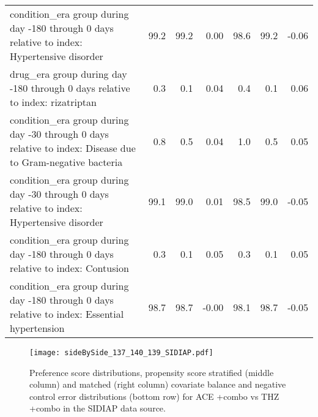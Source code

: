 \documentclass[11pt,]{article}
\begin{document}
\begin{longtable}{p{30em}rrrrrr}
  condition\_era group during day -180 through 0 days relative to index: Hypertensive disorder & 99.2 & 99.2 & 0.00 & 98.6 & 99.2 & -0.06 \\ 
  drug\_era group during day -180 through 0 days relative to index: rizatriptan & 0.3 & 0.1 & 0.04 & 0.4 & 0.1 & 0.06 \\ 
  condition\_era group during day -30 through 0 days relative to index: Disease due to Gram-negative bacteria & 0.8 & 0.5 & 0.04 & 1.0 & 0.5 & 0.05 \\ 
  condition\_era group during day -30 through 0 days relative to index: Hypertensive disorder & 99.1 & 99.0 & 0.01 & 98.5 & 99.0 & -0.05 \\ 
  condition\_era group during day -180 through 0 days relative to index: Contusion & 0.3 & 0.1 & 0.05 & 0.3 & 0.1 & 0.05 \\ 
  condition\_era group during day -180 through 0 days relative to index: Essential hypertension & 98.7 & 98.7 & -0.00 & 98.1 & 98.7 & -0.05 \\ 
  \bottomrule
\end{longtable}
\clearpage\begin{figure}[H]
    \caption{Preference score distributions,
    propensity score stratified (middle column) and matched (right column) covariate balance
    and negative control error distributions (bottom row) for
    ACE +combo vs THZ +combo in the SIDIAP data source.}
    \centerline{
        \texttt{[image: sideBySide\_137\_140\_139\_SIDIAP.pdf]}
    }
\end{figure}
\end{document}
